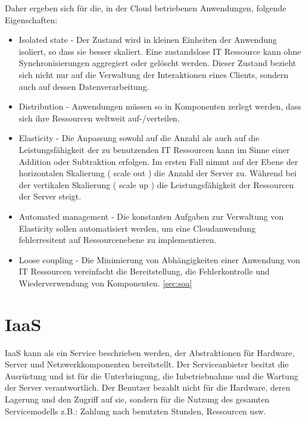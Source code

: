\documentclass[
12pt,
english,
ngerman,
headsepline,
twoside,
openright,
numbers=noenddot,version=first
]{scrreprt}
\begin{document}
Daher ergeben sich für die, in der Cloud betriebenen Anwendungen, folgende Eigenschaften: 
\begin{itemize}
	\item Isolated state - Der Zustand wird in kleinen Einheiten der Anwendung isoliert, so dass sie besser skaliert. Eine zustandslose IT Ressource kann ohne Synchronisierungen aggregiert oder gelöscht werden. Dieser Zustand bezieht sich nicht nur auf die Verwaltung der Interaktionen eines Clients, sondern auch auf dessen Datenverarbeitung. 
	\item Distribution - Anwendungen müssen so in Komponenten zerlegt werden, dass sich ihre Ressourcen weltweit auf-/verteilen.
	\item Elasticity\label{app-char:elascitity} - Die Anpassung sowohl auf die Anzahl als auch auf die Leistungsfähigkeit der zu benutzenden IT Ressourcen kann im Sinne einer Addition oder Subtraktion erfolgen. Im ersten Fall nimmt auf der Ebene der horizontalen Skalierung ( scale out ) die Anzahl der Server zu. Während bei der vertikalen Skalierung ( scale up ) die Leistungsfähigkeit der Ressourcen der Server steigt.
	\item Automated management - Die konstanten Aufgaben zur Verwaltung von Elasticity sollen automatisiert werden, um eine Cloudanwendung fehlerresitent auf Ressourcenebene zu implementieren.
	\item Loose coupling - Die Minimierung von Abhängigkeiten einer Anwendung von IT Ressourcen vereinfacht die Bereitstellung, die Fehlerkontrolle und Wiederverwendung von Komponenten. \ref{sec:soa} \cite{cloudEssentials}
\end{itemize}


\section{IaaS}
\label{sec:iaas}
\acrfull{IaaS} kann als ein Service beschrieben werden, der Abstraktionen für Hardware, Server und Netzwerkkomponenten bereitstellt. Der Serviceanbieter besitzt die Ausrüstung und ist für die Unterbringung, die Inbetriebnahme und die Wartung der Server verantwortlich\cite{patternAWS}. Der Benutzer bezahlt nicht für die Hardware, deren Lagerung und den Zugriff auf sie, sondern für die Nutzung des gesamten Servicemodells z.B.: Zahlung nach benutzten Stunden, Ressourcen usw.
\end{document}
